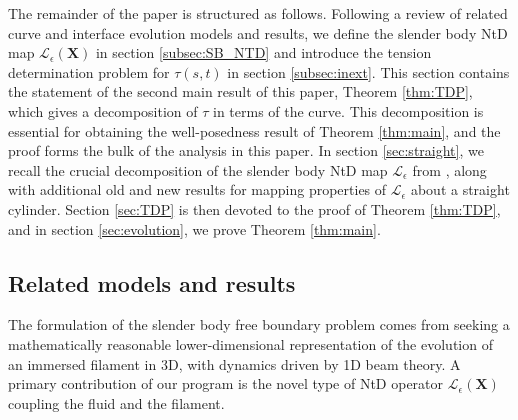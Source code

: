 \documentclass[11pt,reqno]{amsart}
\newcommand{\X}{\bm{X}}
\newcommand{\mc}[1]{\mathcal{#1}}
\theoremstyle{definition}
\begin{document}
The remainder of the paper is structured as follows. Following a review of related curve and interface evolution models and results, we define the slender body NtD map $\mc{L}_\epsilon(\X)$ in section \ref{subsec:SB_NTD} and introduce the tension determination problem for $\tau(s,t)$ in section \ref{subsec:inext}. This section contains the statement of the second main result of this paper, Theorem \ref{thm:TDP}, which gives a decomposition of $\tau$ in terms of the curve. This decomposition is essential for obtaining the well-posedness result of Theorem \ref{thm:main}, and the proof forms the bulk of the analysis in this paper.
In section \ref{sec:straight}, we recall the crucial decomposition of the slender body NtD map $\mc{L}_\epsilon$ from \cite{ohm2024free}, along with additional old and new results for mapping properties of $\mc{L}_\epsilon$ about a straight cylinder.  
Section \ref{sec:TDP} is then devoted to the proof of Theorem \ref{thm:TDP}, and in section \ref{sec:evolution}, we prove Theorem \ref{thm:main}. 





\subsection{Related models and results}\label{subsec:lit}
The formulation of the slender body free boundary problem comes from seeking a mathematically reasonable lower-dimensional representation of the evolution of an immersed filament in 3D, with dynamics driven by 1D beam theory. 
A primary contribution of our program is the novel type of NtD operator $\mc{L}_\epsilon(\X)$ coupling the fluid and the filament. 
\end{document}
